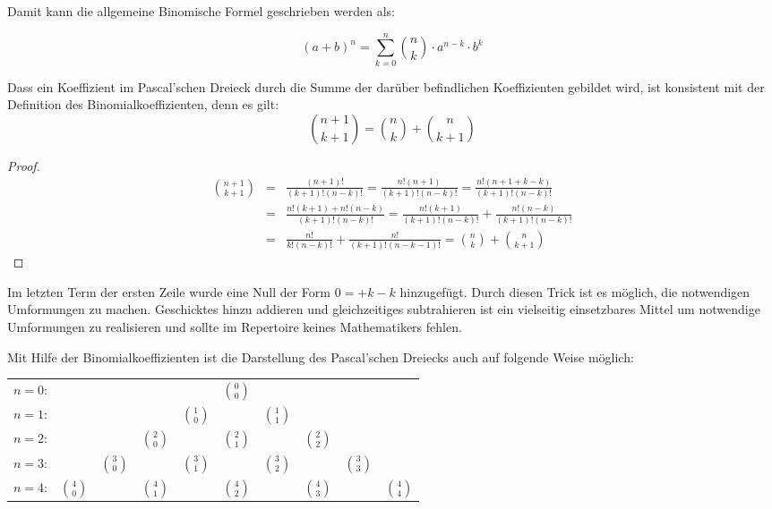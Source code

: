 \noindent Damit kann die allgemeine Binomische Formel geschrieben werden als:

\begin{equation}\label{eq:allgbinom}
(a+b)^n = \sum_{k=0}^{n} \binom{n}{k} \cdot a^{n-k}\cdot b^k
\end{equation}

\begin{lemma}
Dass ein Koeffizient im Pascal'schen Dreieck durch die Summe der darüber befindlichen Koeffizienten gebildet wird, ist konsistent mit der Definition des Binomialkoeffizienten, denn es gilt:
\[
\binom{n+1}{k+1} = \binom{n}{k} + \binom{n}{k+1}
\]
\end{lemma}

\begin{proof}
\begin{eqnarray*}
\binom{n+1}{k+1} &=& \frac{(n+1)!}{(k+1)!(n-k)!} = \frac{n!(n+1)}{(k+1)!(n-k)!} = \frac{n!(n+1+k-k)}{(k+1)!(n-k)!} \\
&=& \frac{n!(k+1) +n!(n-k)}{(k+1)!(n-k)!} = \frac{n!(k+1)}{(k+1)!(n-k)!}+\frac{n!(n-k)}{(k+1)!(n-k)!} \\
&=& \frac{n!}{k!(n-k)!} + \frac{n!}{(k+1)!(n-k-1)!} = \binom{n}{k}+\binom{n}{k+1}
\end{eqnarray*}
\end{proof}

\HandRight \qquad Im letzten Term der ersten Zeile wurde eine Null der Form $0=+k-k$ hinzugefügt. Durch diesen Trick ist es möglich, die notwendigen Umformungen zu machen. Geschicktes hinzu addieren und gleichzeitiges subtrahieren ist ein vielseitig einsetzbares Mittel um notwendige Umformungen zu realisieren und sollte im Repertoire keines Mathematikers fehlen. 

\bigskip

Mit Hilfe der Binomialkoeffizienten ist die Darstellung des Pascal'schen Dreiecks auch auf folgende Weise möglich:

\begin{center}
\begin{tabular}{rccccccccc} 
$n=0$:& & & & & $\binom{0}{0}$\\
\noalign{\smallskip} $n=1$:& & & & $\binom{1}{0}$ & & $\binom{1}{1}$\\
\noalign{\smallskip} $n=2$:& & & $\binom{2}{0}$ & & $\binom{2}{1}$ & & $\binom{2}{2}$\\
\noalign{\smallskip} $n=3$:& & $\binom{3}{0}$ & & $\binom{3}{1}$ & & $\binom{3}{2}$ & & $\binom{3}{3}$\\
\noalign{\smallskip} $n=4$:& $\binom{4}{0}$ & & $\binom{4}{1}$ & & $\binom{4}{2}$ & & $\binom{4}{3}$ & & $\binom{4}{4}$
\end{tabular}
\end{center}



